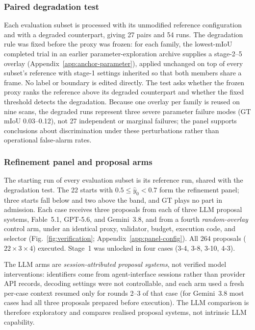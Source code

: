 \documentclass[a4paper,fleqn]{cas-dc}
\begin{document}
\subsubsection{Paired degradation test}
\label{sec:stress-test}

Each evaluation subset is processed with its unmodified reference configuration and with a degraded counterpart, giving 27 pairs and 54 runs. The degradation rule was fixed before the proxy was frozen: for each family, the lowest-mIoU completed trial in an earlier parameter-exploration archive supplies a stage-2--5 overlay (Appendix~\ref{app:anchor-parameter}), applied unchanged on top of every subset's reference with stage-1 settings inherited so that both members share a frame. No label or boundary is edited directly. The test asks whether the frozen proxy ranks the reference above its degraded counterpart and whether the fixed threshold detects the degradation. Because one overlay per family is reused on nine scans, the degraded runs represent three severe parameter failure modes (GT mIoU 0.03--0.12), not 27 independent or marginal failures; the panel supports conclusions about discrimination under these perturbations rather than operational false-alarm rates.

\subsubsection{Refinement panel and proposal arms}
\label{sec:poc-protocol}

The starting run of every evaluation subset is its reference run, shared with the degradation test. The 22 starts with $0.5\le\hat y_0<0.7$ form the refinement panel; three starts fall below and two above the band, and GT plays no part in admission. Each case receives three proposals from each of three LLM proposal systems, Fable~5.1, GPT-5.6, and Gemini~3.8, and from a fourth \emph{random-overlay} control arm, under an identical proxy, validator, budget, execution code, and selector (Fig.~\ref{fig:verification}; Appendix~\ref{app:panel-config}). All $264$ proposals ($22\times3\times4$) executed. Stage~1 was unlocked in four cases (3-4, 3-8, 3-10, 4-3).

The LLM arms are \emph{session-attributed proposal systems}, not verified model interventions: identifiers come from agent-interface sessions rather than provider API records, decoding settings were not controllable, and each arm used a fresh per-case context resumed only for rounds 2--3 of that case (for Gemini~3.8 most cases had all three proposals prepared before execution). The LLM comparison is therefore exploratory and compares realised proposal systems, not intrinsic LLM capability.
\end{document}
